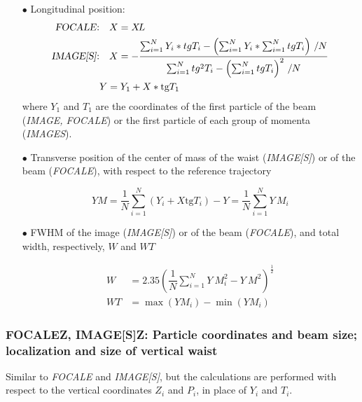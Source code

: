 \begin{itemize}
\item[$\bullet$]Longitudinal position: 
       \begin{align*}
       \text{\textsl{FOCALE}:} & \quad  X=\XL  \\
       \text{\textsl{IMAGE[S]}:} & \quad   X    = - 
    \dfrac{ \sum^ N_{i=1}Y_i\ast tgT_i- 
         \left( \sum^ N_{i=1}Y_i\ast \sum^N_{i=1}tgT_i \right)\, /N }{%
        \sum^ N_{i=1}tg^2T_i- \left( \sum^ N_{i=1}tgT_i\right)^2\, /N} \\ 
            & Y   =   Y_1+X  \ast   \text{tg} T_1  
        \end{align*}    
where $ Y_1 $ and $ T_1 $ are the coordinates of the first particle
of the beam (\textsl{IMAGE, FOCALE}) or the first particle of each group of momenta 
(\textsl{IMAGES}). 

\item[$\bullet$]Transverse position of the center of mass of the waist 
(\textsl{IMAGE[S]}) or of the beam (\textsl{FOCALE}), with respect to the reference trajectory 

$$ YM = \frac{1 }{ N} \sum^ N_{i=1}(Y_i+X  \text{tg} T_i)-Y=
      \frac{1 }{ N} \sum^ N_{i=1}Y\, M_i $$

\item[$\bullet$]FWHM of the image (\textsl{IMAGE[S]}) or of the beam 
(\textsl{FOCALE}), and  total width, respectively, $ W $ and $ WT $

\begin{align*}
	W &   =     2.35 \left( \dfrac{1 }{ N} \sum^ N_{i=1}Y\ M^2_i - Y\ M^2 \right)^{\frac{1}{2}} \\ 
	WT &   =    \max (YM_i)- \min  (YM_i)  
\end{align*}
\end{itemize}

\vfill

\subsubsection*{FOCALEZ, IMAGE[S]Z: Particle coordinates and beam size;  localization and 
size  of  vertical waist}\label{FOCALEZ}\label{IMAGEZ}\label{IMAGESZ}
          
Similar to \textsl{FOCALE} and \textsl{IMAGE[S]}, but the calculations are performed 
with respect to the vertical coordinates $ Z_i $ and $ P_i $, in place of $Y_i $ 
and $ T_i$. 
\vfill

